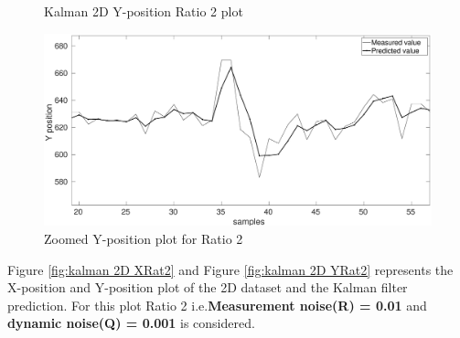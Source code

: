 \documentclass[12pt]{article}
\begin{document}
\begin{figure}[h]
\begin{minipage}{0.5\textwidth}
	\caption{Kalman 2D Y-position Ratio 2 plot }
	\label{fig:kalman 2D YRat2}
\end{minipage}%
\begin{minipage}{0.5\textwidth}
\centering
	\includegraphics[width = \textwidth]{./Figures/part2Ratio2Yzoomed.eps}
	\caption{ Zoomed Y-position plot for Ratio 2}
	\label{fig: kalman 2D YRat2 zoom}
\end{minipage}
\end{figure}
\noindent
Figure \ref{fig:kalman 2D XRat2} and Figure \ref{fig:kalman 2D YRat2} represents the X-position and Y-position plot of the 2D dataset and the Kalman filter prediction. For this plot Ratio 2 i.e.\textbf{Measurement noise(R) = 0.01} and \textbf{dynamic noise(Q) = 0.001} is considered.\\
\newpage
\end{document}
